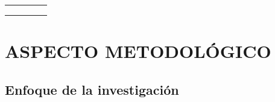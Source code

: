 \documentclass[12pt,a4paper]{article}
\begin{document}
\begin{table}[ht!]
\begin{tabular}{|c|l|l|c|c|}
		                    &                                                   & \multirow{1}{*}{\fbbbbbbbbbbbbb}   &                                                                              &                                                                \\\cline{3-3}
		                    &                                                   & \multirow{1}{*}{\fbbbbbbbbbbbbbb}  &                                                                              &                                                                \\\cline{3-3}
		                    &                                                   & \multirow{1}{*}{\fbbbbbbbbbbbbbbb} &                                                                              &                                                                \\\hline
	\end{tabular}
\end{table}

\section{ASPECTO METODOLÓGICO}

\subsection{Enfoque de la investigación}
%

\end{document}
